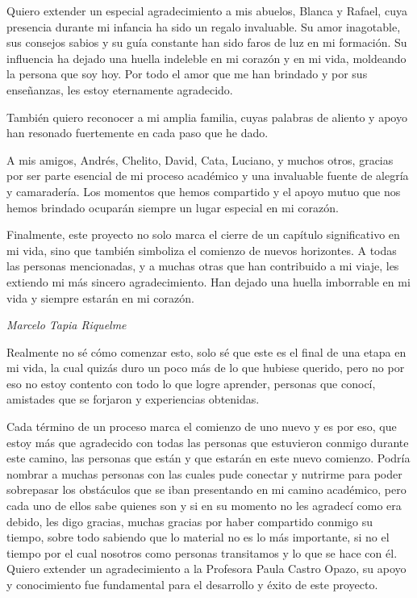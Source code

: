 Quiero extender un especial agradecimiento a mis abuelos, Blanca y Rafael, cuya presencia durante mi infancia ha sido un regalo invaluable. Su amor inagotable, sus consejos sabios y su guía constante han sido faros de luz en mi formación. Su influencia ha dejado una huella indeleble en mi corazón y en mi vida, moldeando la persona que soy hoy. Por todo el amor que me han brindado y por sus enseñanzas, les estoy eternamente agradecido.

También quiero reconocer a mi amplia familia, cuyas palabras de aliento y apoyo han resonado fuertemente en cada paso que he dado.

A mis amigos, Andrés, Chelito, David, Cata, Luciano, y muchos otros, gracias por ser parte esencial de mi proceso académico y una invaluable fuente de alegría y camaradería. Los momentos que hemos compartido y el apoyo mutuo que nos hemos brindado ocuparán siempre un lugar especial en mi corazón.

Finalmente, este proyecto no solo marca el cierre de un capítulo significativo en mi vida, sino que también simboliza el comienzo de nuevos horizontes. A todas las personas mencionadas, y a muchas otras que han contribuido a mi viaje, les extiendo mi más sincero agradecimiento. Han dejado una huella imborrable en mi vida y siempre estarán en mi corazón.

\textit{Marcelo Tapia Riquelme}

\newpage
Realmente no sé cómo comenzar esto, solo sé que este es el final de una etapa en mi vida, la cual quizás duro un poco más de lo que hubiese querido, pero no por eso no estoy contento con todo lo que logre aprender, personas que conocí, amistades que se forjaron y experiencias obtenidas.

Cada término de un proceso marca el comienzo de uno nuevo y es por eso, que estoy más que agradecido con todas las personas que estuvieron conmigo durante este camino, las personas que están y que estarán en este nuevo comienzo. Podría nombrar a muchas personas con las cuales pude conectar y nutrirme para poder sobrepasar los obstáculos que se iban presentando en mi camino académico, pero cada uno de ellos sabe quienes son y si en su momento no les agradecí como era debido, les digo gracias, muchas gracias por haber compartido conmigo su tiempo, sobre todo sabiendo que lo material no es lo más importante, si no el tiempo por el cual nosotros como personas transitamos y lo que se hace con él. Quiero extender un agradecimiento a la Profesora Paula Castro Opazo, su apoyo y conocimiento fue fundamental para el desarrollo y éxito de este proyecto.


